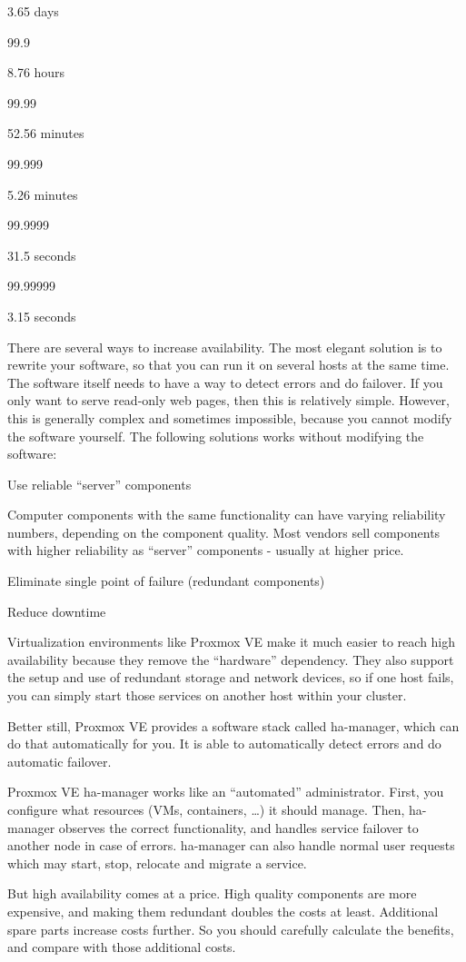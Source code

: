 3.65 days

99.9

8.76 hours

99.99

52.56 minutes

99.999

5.26 minutes

99.9999

31.5 seconds

99.99999

3.15 seconds

There are several ways to increase availability. The most elegant solution is to rewrite your software, so that you can run it on several hosts at the same time. The software itself needs to have a way to detect errors and do failover. If you only want to serve read-only web pages, then this is relatively simple. However, this is generally complex and sometimes impossible, because you cannot modify the software yourself. The following solutions works without modifying the software:

Use reliable “server” components

Computer components with the same functionality can have varying reliability numbers, depending on the component quality. Most vendors sell components with higher reliability as “server” components - usually at higher price.

Eliminate single point of failure (redundant components)

Reduce downtime

Virtualization environments like Proxmox VE make it much easier to reach high availability because they remove the “hardware” dependency. They also support the setup and use of redundant storage and network devices, so if one host fails, you can simply start those services on another host within your cluster.

Better still, Proxmox VE provides a software stack called ha-manager, which can do that automatically for you. It is able to automatically detect errors and do automatic failover.

Proxmox VE ha-manager works like an “automated” administrator. First, you configure what resources (VMs, containers, …) it should manage. Then, ha-manager observes the correct functionality, and handles service failover to another node in case of errors. ha-manager can also handle normal user requests which may start, stop, relocate and migrate a service.

But high availability comes at a price. High quality components are more expensive, and making them redundant doubles the costs at least. Additional spare parts increase costs further. So you should carefully calculate the benefits, and compare with those additional costs.

